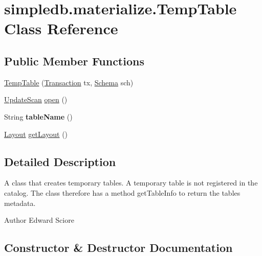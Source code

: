 \hypertarget{classsimpledb_1_1materialize_1_1TempTable}{}\section{simpledb.\+materialize.\+Temp\+Table Class Reference}
\label{classsimpledb_1_1materialize_1_1TempTable}
\subsection*{Public Member Functions}
\begin{DoxyCompactItemize}
\item 
\hyperlink{classsimpledb_1_1materialize_1_1TempTable_adc3cebb2d2dd45f141fb4f3b8bd36e88}{Temp\+Table} (\hyperlink{classsimpledb_1_1tx_1_1Transaction}{Transaction} tx, \hyperlink{classsimpledb_1_1record_1_1Schema}{Schema} sch)
\item 
\hyperlink{interfacesimpledb_1_1query_1_1UpdateScan}{Update\+Scan} \hyperlink{classsimpledb_1_1materialize_1_1TempTable_adcf144ac73b859736c7d2f71fb42e22e}{open} ()
\item 
\mbox{\label{classsimpledb_1_1materialize_1_1TempTable_a300c905ab7314f1bbddfec7339dc0f80}} 
String {\bfseries table\+Name} ()
\item 
\hyperlink{classsimpledb_1_1record_1_1Layout}{Layout} \hyperlink{classsimpledb_1_1materialize_1_1TempTable_abf17e522f52e49657f10db1156e05c46}{get\+Layout} ()
\end{DoxyCompactItemize}


\subsection{Detailed Description}
A class that creates temporary tables. A temporary table is not registered in the catalog. The class therefore has a method get\+Table\+Info to return the table\textquotesingle{}s metadata. \begin{DoxyAuthor}{Author}
Edward Sciore 
\end{DoxyAuthor}


\subsection{Constructor \& Destructor Documentation}
\mbox{\label{classsimpledb_1_1materialize_1_1TempTable_adc3cebb2d2dd45f141fb4f3b8bd36e88}} 
